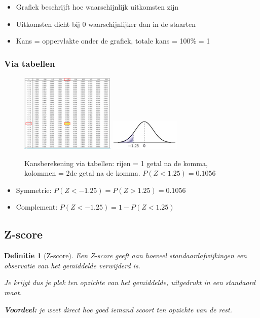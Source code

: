 \documentclass{article}
\newtheorem{theorem}{Definitie}[section]
\begin{document}
\begin{itemize}
    \item Grafiek beschrijft hoe waarschijnlijk uitkomsten zijn
    \item Uitkomsten dicht bij 0 waarschijnlijker dan in de staarten
    \item Kans = oppervlakte onder de grafiek, totale kans = 100\% = 1
\end{itemize}

\subsubsection{Via tabellen}

\begin{figure}[H]
    \centering
    \includegraphics[width=0.4\textwidth]{normaalverdeling-tabel.png}
    \includegraphics[width=0.3\textwidth]{normaalverdeling-tabel2.png}
    \caption{Kansberekening via tabellen: rijen = 1 getal na de komma, kolommen = 2de getal na de komma. $P(Z < 1.25) = 0.1056$}
\end{figure}

\begin{itemize}
    \item Symmetrie: $P(Z < -1.25) = P(Z > 1.25) = 0.1056$
    \item Complement: $P(Z < -1.25) = 1- P(Z < 1.25)$
\end{itemize}

\subsection{Z-score}

\begin{theorem}[Z-score]
    Een Z-score geeft aan hoeveel standaardafwijkingen een observatie van het gemiddelde verwijderd is.

    Je krijgt dus je plek ten opzichte van het gemiddelde, uitgedrukt in een
    standaard maat.

    \textbf{Voordeel:} je weet direct hoe goed iemand scoort ten opzichte van de
    rest.
\end{theorem}
\end{document}
